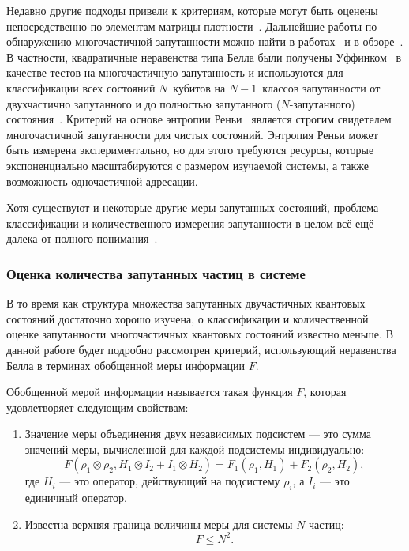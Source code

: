 Недавно другие подходы привели к критериям, которые могут быть оценены непосредственно по элементам матрицы плотности~\cite{Guhne2010, Huber2010}.
Дальнейшие работы по обнаружению многочастичной запутанности можно найти в работах~\cite{Li2010, Jungnitsch2011, Vicente2011, Huber2011} и в обзоре~\cite{Guhne2009}.
В частности, квадратичные неравенства типа Белла были получены Уффинком~\cite{Uffink2002, Nagata2002} в качестве тестов на многочастичную запутанность
и используются для классификации всех состояний $N$~кубитов на $N-1$~классов запутанности от двухчастично запутанного и до полностью запутанного
 ($N$-запутанного) состояния~\cite{Yu2003}.
Критерий на основе энтропии Реньи~\cite{Hosur2016, Fan2017}
является строгим свидетелем многочастичной запутанности для чистых состояний.
Энтропия Реньи может быть измерена экспериментально,
но для этого требуются ресурсы,
которые экспоненциально масштабируются с размером изучаемой системы,
а также возможность одночастичной адресации.

Хотя существуют и некоторые другие меры запутанных состояний, проблема классификации и количественного измерения
запутанности в целом всё ещё далека от полного
понимания~\cite{Guhne2009}.


\subsubsection{Оценка количества запутанных частиц в системе}
\label{sec:manyparticle-entanglement-criteria}
В то время как структура множества запутанных двучастичных квантовых состояний достаточно хорошо изучена,
о классификации и количественной оценке запутанности многочастичных квантовых состояний известно меньше\cite{Plbnio2007, Amico2008, Horodecki2009, Guhne2009}.
%
В данной работе будет подробно рассмотрен критерий,
использующий  неравенства Белла\cite{Bell1964} в терминах обобщенной меры информации $F$.

\begin{definition}\label{def:f}
Обобщенной мерой информации называется такая функция $F$,
которая удовлетворяет следующим свойствам:
\begin{enumerate}
  \item Значение меры объединения двух независимых подсистем --- это сумма значений меры, вычисленной для каждой подсистемы индивидуально:
  \begin{equation}\label{eq:f-additive-map}
    F(\rho_1 \otimes \rho_2 ,H_1 \otimes I_2 + I_1 \otimes H_2)
    = F_{1} (\rho_1, H_1) + F_{2} (\rho_2 , H_2),
  \end{equation}
  где $H_i$ --- это оператор, действующий на подсистему $\rho_i$,
  а $I_i$ --- это единичный оператор.

  \item Известна верхняя граница величины меры для системы $N$ частиц:
  \begin{equation}\label{eq:f-supremum}
    F \leq N^2.
  \end{equation}
\end{enumerate}
\end{definition}

